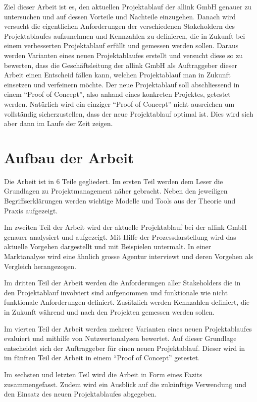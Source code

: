 Ziel dieser Arbeit ist es, den aktuellen Projektablauf der
allink GmbH genauer zu untersuchen und auf dessen Vorteile und Nachteile einzugehen.
Danach wird versucht die eigentlichen Anforderungen der verschiedenen Stakeholdern
des Projektablaufes aufzunehmen und Kennzahlen zu definieren, die in Zukunft
bei einem verbesserten Projektablauf erfüllt und gemessen werden sollen.
Daraus werden Varianten eines neuen Projektablaufes erstellt und versucht 
diese so zu bewerten, dass die Geschäftsleitung der allink GmbH als Auftraggeber 
dieser Arbeit einen
Entscheid fällen kann, welchen Projektablauf man in Zukunft einsetzen und 
verfeinern möchte. Der neue Projektablauf soll abschliessend in einem ``Proof of Concept'', also
anhand eines konkreten Projektes, getestet werden. Natürlich wird ein einziger
``Proof of Concept'' nicht ausreichen um vollständig sicherzustellen, dass der
neue Projektablauf optimal ist. Dies wird sich aber dann im Laufe der Zeit zeigen.

\section{Aufbau der Arbeit}
Die Arbeit ist in 6 Teile gegliedert. Im ersten Teil werden dem Leser die
Grundlagen zu Projektmanagement näher gebracht. Neben
den jeweiligen Begriffserklärungen werden wichtige Modelle und Tools aus der
Theorie und Praxis aufgezeigt.

Im zweiten Teil der Arbeit wird der aktuelle Projektablauf bei der allink
GmbH genauer analysiert und aufgezeigt. Mit Hilfe der Prozessdarstellung wird
das aktuelle Vorgehen dargestellt und mit Beispielen untermalt. In einer
Marktanalyse wird eine ähnlich grosse Agentur interviewt und deren Vorgehen
als Vergleich herangezogen.

Im dritten Teil der Arbeit werden die Anforderungen aller Stakeholders die in
den Projektablauf involviert sind aufgenommen und funktionale wie nicht funktionale
Anforderungen definiert. Zusätzlich werden Kennzahlen definiert, die in Zukunft
während und nach den Projekten gemessen werden sollen.

Im vierten Teil der Arbeit werden mehrere Varianten eines neuen Projektablaufes
evaluiert und mithilfe von Nutzwertanalysen bewertet. Auf dieser Grundlage
entscheidet sich der Auftraggeber für einen neuen Projektablauf. Dieser wird in 
im fünften Teil der Arbeit in einem ``Proof of Concept'' getestet.

Im sechsten und letzten Teil wird die Arbeit in Form eines Fazits zusammengefasst.
Zudem wird ein Ausblick auf die zukünftige Verwendung und den Einsatz des neuen
Projektablaufes abgegeben.

